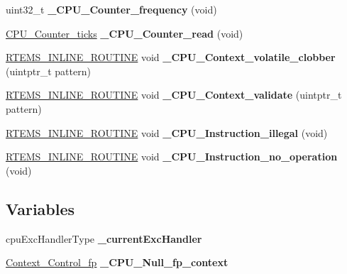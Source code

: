 \begin{DoxyCompactItemize}
\mbox{\label{group__RTEMSScoreCPUi386_gaa675150e5d00169c99410a82011b6117}} 
uint32\+\_\+t {\bfseries \+\_\+\+C\+P\+U\+\_\+\+Counter\+\_\+frequency} (void)
\item 
\mbox{\label{group__RTEMSScoreCPUi386_gac016ae4ed92ed2607bd65408a36d908b}} 
\mbox{\hyperlink{no__cpu_2include_2rtems_2score_2cpu_8h_a67f8550aad58bccb6fcb4589894444ad}{C\+P\+U\+\_\+\+Counter\+\_\+ticks}} {\bfseries \+\_\+\+C\+P\+U\+\_\+\+Counter\+\_\+read} (void)
\item 
\mbox{\label{group__RTEMSScoreCPUi386_gaeb1ddd8f84f82b13fad2a05a3e7d0ab7}} 
\mbox{\hyperlink{group__RTEMSScoreBaseDefs_gac216239df231d5dbd15e3520b0b9313f}{R\+T\+E\+M\+S\+\_\+\+I\+N\+L\+I\+N\+E\+\_\+\+R\+O\+U\+T\+I\+NE}} void {\bfseries \+\_\+\+C\+P\+U\+\_\+\+Context\+\_\+volatile\+\_\+clobber} (uintptr\+\_\+t pattern)
\item 
\mbox{\label{group__RTEMSScoreCPUi386_gaae027d9a906bb67d38ebd7a9104b976b}} 
\mbox{\hyperlink{group__RTEMSScoreBaseDefs_gac216239df231d5dbd15e3520b0b9313f}{R\+T\+E\+M\+S\+\_\+\+I\+N\+L\+I\+N\+E\+\_\+\+R\+O\+U\+T\+I\+NE}} void {\bfseries \+\_\+\+C\+P\+U\+\_\+\+Context\+\_\+validate} (uintptr\+\_\+t pattern)
\item 
\mbox{\label{group__RTEMSScoreCPUi386_ga07618c93359f2485af2e98a96b330208}} 
\mbox{\hyperlink{group__RTEMSScoreBaseDefs_gac216239df231d5dbd15e3520b0b9313f}{R\+T\+E\+M\+S\+\_\+\+I\+N\+L\+I\+N\+E\+\_\+\+R\+O\+U\+T\+I\+NE}} void {\bfseries \+\_\+\+C\+P\+U\+\_\+\+Instruction\+\_\+illegal} (void)
\item 
\mbox{\label{group__RTEMSScoreCPUi386_gab683a0a37a089e2a0fd3c356836d5499}} 
\mbox{\hyperlink{group__RTEMSScoreBaseDefs_gac216239df231d5dbd15e3520b0b9313f}{R\+T\+E\+M\+S\+\_\+\+I\+N\+L\+I\+N\+E\+\_\+\+R\+O\+U\+T\+I\+NE}} void {\bfseries \+\_\+\+C\+P\+U\+\_\+\+Instruction\+\_\+no\+\_\+operation} (void)
\end{DoxyCompactItemize}
\subsection*{Variables}
\begin{DoxyCompactItemize}
\item 
\mbox{\label{group__RTEMSScoreCPUi386_ga75ab01280c139fde58b4e3594779dd1f}} 
cpu\+Exc\+Handler\+Type {\bfseries \+\_\+current\+Exc\+Handler}
\item 
\mbox{\label{group__RTEMSScoreCPUi386_gaf07fa780651217bccbbd992ae527164c}} 
\mbox{\hyperlink{structContext__Control__fp}{Context\+\_\+\+Control\+\_\+fp}} {\bfseries \+\_\+\+C\+P\+U\+\_\+\+Null\+\_\+fp\+\_\+context}
\end{DoxyCompactItemize}


